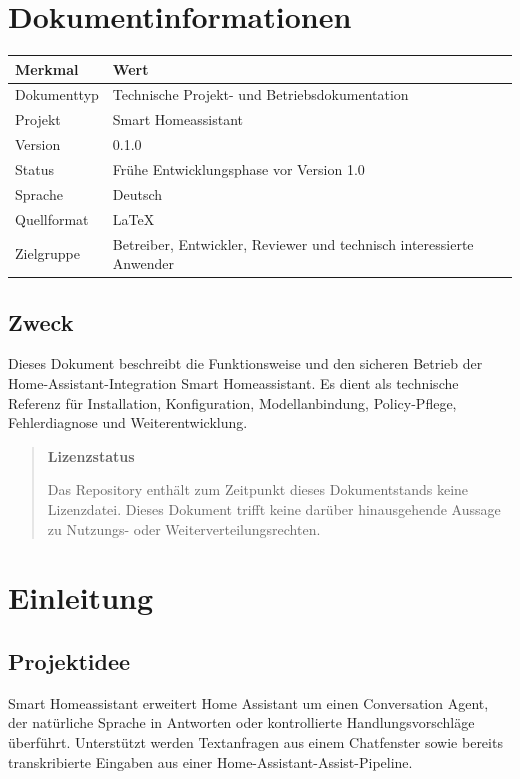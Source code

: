 \documentclass[
  11pt,
  a4paper,
  oneside,
  parskip=half
]{scrreprt}
\newenvironment{smartwarning}[1]
{%
  \begin{quote}
    \color{SmartDark}
    \textbf{\textcolor{SmartAmber!80!black}{#1}}\par\smallskip
}
{%
  \end{quote}
}
\begin{document}
\chapter*{Dokumentinformationen}

\begin{tabularx}{\textwidth}{@{}L{38mm}Y@{}}
  \toprule
  \textbf{Merkmal} & \textbf{Wert} \\
  \midrule
  Dokumenttyp & Technische Projekt- und Betriebsdokumentation \\
  Projekt & Smart Homeassistant \\
  Version & 0.1.0 \\
  Status & Frühe Entwicklungsphase vor Version 1.0 \\
  Sprache & Deutsch \\
  Quellformat & \LaTeX \\
  Zielgruppe & Betreiber, Entwickler, Reviewer und technisch interessierte Anwender \\
  \bottomrule
\end{tabularx}

\section*{Zweck}

Dieses Dokument beschreibt die Funktionsweise und den sicheren Betrieb der
Home-Assistant-Integration Smart Homeassistant. Es dient als technische Referenz für
Installation, Konfiguration, Modellanbindung, Policy-Pflege, Fehlerdiagnose und
Weiterentwicklung.

\begin{smartwarning}{Lizenzstatus}
Das Repository enthält zum Zeitpunkt dieses Dokumentstands keine Lizenzdatei. Dieses
Dokument trifft keine darüber hinausgehende Aussage zu Nutzungs- oder
Weiterverteilungsrechten.
\end{smartwarning}

\tableofcontents
\clearpage

\chapter{Einleitung}

\section{Projektidee}

Smart Homeassistant erweitert Home Assistant um einen Conversation Agent, der natürliche
Sprache in Antworten oder kontrollierte Handlungsvorschläge überführt. Unterstützt werden
Textanfragen aus einem Chatfenster sowie bereits transkribierte Eingaben aus einer
Home-Assistant-Assist-Pipeline.
\end{document}
